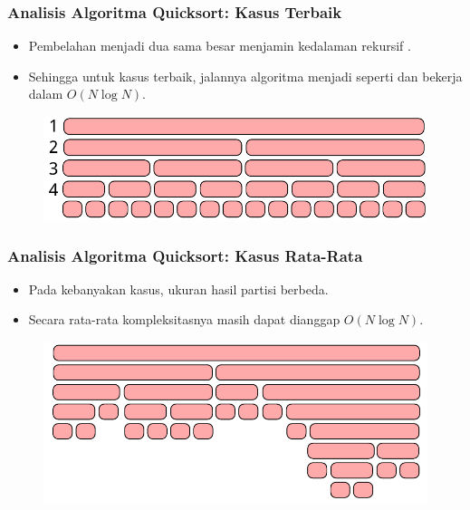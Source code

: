 \begin{frame}
\frametitle{Analisis Algoritma Quicksort: Kasus Terbaik}
\begin{itemize}
  \item Pembelahan menjadi dua \fsubarray sama besar menjamin kedalaman rekursif .
  \item Sehingga untuk kasus terbaik, jalannya algoritma menjadi seperti \fmergeSort dan bekerja dalam $O(N \log{N})$.
\end{itemize}
\begin{figure}
  \centering
  \includegraphics[width=10 cm]{asset/merge-sort-complexity.pdf}
\end{figure}
\end{frame}
  
\begin{frame}
\frametitle{Analisis Algoritma Quicksort: Kasus Rata-Rata}
\begin{itemize}
  \item Pada kebanyakan kasus, ukuran hasil partisi berbeda.
  \item Secara rata-rata kompleksitasnya masih dapat dianggap $O(N \log{N})$.
\end{itemize}
\begin{figure}
  \centering
  \includegraphics[width=10 cm]{asset/quicksort-complexity-average.pdf}
\end{figure}
\end{frame}

